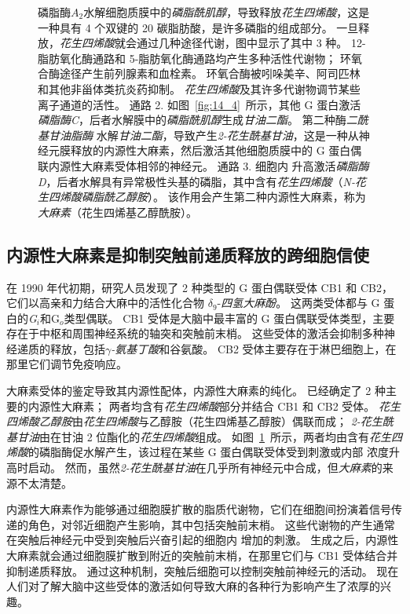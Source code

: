 \begin{figure}[htbp]
{		磷脂酶$A_2$水解细胞质膜中的\textit{磷脂酰肌醇}，导致释放\textit{花生四烯酸}，这是一种具有 4 个双键的 20 碳脂肪酸，是许多磷脂的组成部分。
		一旦释放，\textit{花生四烯酸}就会通过几种途径代谢，图中显示了其中 3 种。
		12-脂肪氧化酶通路和 5-脂肪氧化酶通路均产生多种活性代谢物；
		环氧合酶途径产生前列腺素和血栓素。
		环氧合酶被吲哚美辛、阿司匹林和其他非甾体类抗炎药抑制。
		\textit{花生四烯酸}及其许多代谢物调节某些离子通道的活性。
		通路 2. 如图~\ref{fig:14_4}~所示，其他 G 蛋白激活\textit{磷脂酶C}，后者水解膜中的\textit{磷脂酰肌醇}生成\textit{甘油二酯}。
		第二种酶\textit{二酰基甘油脂酶} 水解\textit{甘油二酯}，导致产生\textit{2-花生酰基甘油}，这是一种从神经元膜释放的内源性大麻素，然后激活其他细胞质膜中的 G 蛋白偶联内源性大麻素受体相邻的神经元。
		通路 3. 细胞内  升高激活\textit{磷脂酶 D}，后者水解具有异常极性头基的磷脂，其中含有\textit{花生四烯酸}（\textit{N-花生四烯酸磷脂酰乙醇胺}）。
		该作用会产生第二种内源性大麻素，称为\textit{大麻素}（花生四烯基乙醇酰胺）。}
	\label{fig:14_6}
\end{figure}



\subsection{内源性大麻素是抑制突触前递质释放的跨细胞信使}

在 1990 年代初期，研究人员发现了 2 种类型的 G 蛋白偶联受体 CB1 和 CB2，它们以高亲和力结合大麻中的活性化合物 $\delta_9$-\textit{四氢大麻酚}。
这两类受体都与 G 蛋白的\textit{G$_i $}和G$_o$类型偶联。
CB1 受体是大脑中最丰富的 G 蛋白偶联受体类型，主要存在于中枢和周围神经系统的轴突和突触前末梢。
这些受体的激活会抑制多种神经递质的释放，包括\textit{$\gamma$-氨基丁酸}和谷氨酸。
CB2 受体主要存在于淋巴细胞上，在那里它们调节免疫响应。


大麻素受体的鉴定导致其内源性配体，内源性大麻素的纯化。
已经确定了 2 种主要的内源性大麻素；
两者均含有\textit{花生四烯酸}部分并结合 CB1 和 CB2 受体。 
\textit{花生四烯酸乙醇胺}由\textit{花生四烯酸}与乙醇胺（花生四烯基乙醇胺）偶联而成；
\textit{2-花生酰基甘油}由在甘油 2 位酯化的\textit{花生四烯酸}组成。
如图~\ref{fig:14_6}~所示，两者均由含有\textit{花生四烯酸}的磷脂酶促水解产生，该过程在某些 G 蛋白偶联受体受到刺激或内部  浓度升高时启动。
然而，虽然\textit{2-花生酰基甘油}在几乎所有神经元中合成，但\textit{大麻素}的来源不太清楚。


内源性大麻素作为能够通过细胞膜扩散的脂质代谢物，它们在细胞间扮演着信号传递的角色，对邻近细胞产生影响，其中包括突触前末梢。
这些代谢物的产生通常在突触后神经元中受到突触后兴奋引起的细胞内  增加的刺激。
生成之后，内源性大麻素就会通过细胞膜扩散到附近的突触前末梢，在那里它们与 CB1 受体结合并抑制递质释放。
通过这种机制，突触后细胞可以控制突触前神经元的活动。 
现在人们对了解大脑中这些受体的激活如何导致大麻的各种行为影响产生了浓厚的兴趣。



